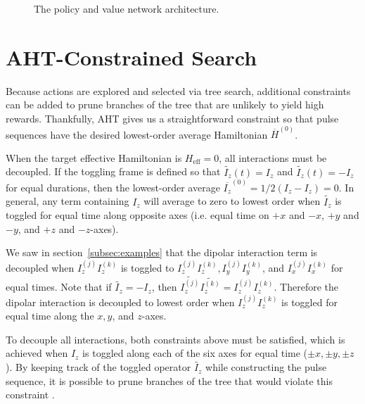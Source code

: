 \begin{figure}[H]
    \centering
    
    \caption{The policy and value network architecture.}
    \label{fig:nn}
\end{figure}


\section{AHT-Constrained Search}\label{sec:AHT-constraints}

Because actions are explored and selected via tree search, additional constraints can be added to prune branches of the tree that are unlikely to yield high rewards. Thankfully, AHT gives us a straightforward constraint so that pulse sequences have the desired lowest-order average Hamiltonian $\overline{H}^{(0)}$.

When the target effective Hamiltonian is $H_\text{eff} = 0$, all interactions must be decoupled. If the toggling frame is defined so that $\widetilde{I_z}(t) = I_z$ and $\widetilde{I_z}(t) = -I_z$ for equal durations, then the lowest-order average $\overline{I_z}^{(0)} = 1/2(I_z - I_z) = 0$. In general, any term containing $I_z$ will average to zero to lowest order when $\widetilde{I_z}$ is toggled for equal time along opposite axes (i.e. equal time on $+x$ and $-x$, $+y$ and $-y$, and $+z$ and $-z$-axes).

We saw in section~\ref{subsec:examples} that the dipolar interaction term is decoupled when $I_z^{(j)}I_z^{(k)}$ is toggled to $I_z^{(j)}I_z^{(k)}, I_y^{(j)}I_y^{(k)}$, and $I_x^{(j)}I_x^{(k)}$ for equal times. Note that if $\widetilde{I_z} = -I_z$, then $\widetilde{I_z^{(j)}}\widetilde{I_z^{(k)}} = I_z^{(j)}I_z^{(k)}$.
Therefore the dipolar interaction is decoupled to lowest order when $I_z^{(j)}I_z^{(k)}$ is toggled for equal time along the $x, y$, and $z$-axes.

To decouple all interactions, both constraints above must be satisfied, which is achieved when $I_z$ is toggled along each of the six axes for equal time ($\pm x, \pm y, \pm z$). By keeping track of the toggled operator $\widetilde{I_z}$ while constructing the pulse sequence, it is possible to prune branches of the tree that would violate this constraint%
.



